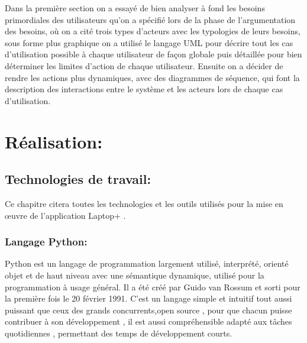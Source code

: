 \documentclass[a4paper]{report}
\begin{document}
\begin{doublespace}
\begin{doublespace}
\begin{doublespace}
\begin{doublespace}
                Dans la première section on a essayé de bien analyser à
                fond les besoins primordiales des utilisateurs qu'on a spécifié lors de la
                phase de l'argumentation des besoins, où on a cité trois types d'acteurs avec
                les typologies de leurs besoins, sous forme plus graphique on a utilisé le
                langage UML pour décrire tout les cas d'utilisation possible à chaque
                utilisateur de façon globale puis  détaillée pour bien déterminer les limites
                d'action de chaque utilisateur.
                Ensuite on a décider de rendre les actions plus dynamiques,
                avec des diagrammes de séquence, qui font la description des interactions entre
                le système et les acteurs lors de chaque cas d'utilisation.

                \chapter{Réalisation:}
                \fancyhead[L]{\hspace*{5cm}}
                \begin{doublespace}

                    \section{Technologies de travail:}
                    Ce chapitre citera toutes les technologies et les
                    outils utilisés pour la mise en œuvre de l'application Laptop+ .
                    \subsection{Langage Python:}
                    \begin{figure}[H]
                        \raggedleft{
                        }
                    \end{figure}
                    Python est un langage de programmation largement
                    utilisé, interprété, orienté objet et de haut niveau avec une sémantique
                    dynamique, utilisé pour la programmation à usage général. Il a été créé par
                    Guido van Rossum et sorti pour la première fois le 20 février 1991. C'est un
                    langage simple et intuitif tout aussi puissant que ceux des grands
                    concurrents,open source , pour que chacun puisse contribuer à son développement
                    , il est aussi compréhensible
                    adapté aux tâches quotidiennes , permettant des temps
                    de développement courts.


\end{doublespace}
\end{doublespace}
\end{doublespace}
\end{doublespace}
\end{doublespace}
\end{document}
